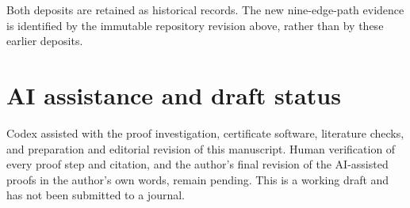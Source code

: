 \documentclass[12pt]{article}
\begin{document}
Both deposits are retained as historical records.
The new nine-edge-path evidence is identified by the
immutable repository revision above, rather than by
these earlier deposits.

\section*{AI assistance and draft status}

Codex assisted with the proof investigation, certificate
software, literature checks, and preparation and editorial
revision of this manuscript. Human verification of every
proof step and citation, and the author's final revision
of the AI-assisted proofs in the author's own words,
remain pending. This is a working draft and has not been
submitted to a journal.

\clearpage
\end{document}
